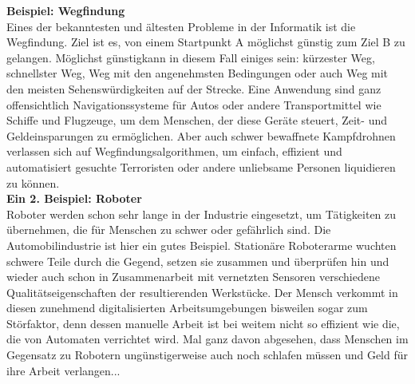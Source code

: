 {    \vspace{3mm}


    \textbf{Beispiel: Wegfindung}\\
    Eines der bekanntesten und ältesten Probleme in der Informatik ist die Wegfindung. Ziel ist es, von einem Startpunkt A möglichst günstig zum Ziel B zu gelangen. \glqq Möglichst günstig\grqq kann in diesem Fall einiges sein: kürzester Weg, schnellster Weg, Weg mit den angenehmsten Bedingungen oder auch Weg mit den meisten Sehenswürdigkeiten auf der Strecke. Eine Anwendung sind ganz offensichtlich Navigationssysteme für Autos oder andere Transportmittel wie Schiffe und Flugzeuge, um dem Menschen, der diese Geräte steuert, Zeit- und Geldeinsparungen zu ermöglichen. Aber auch schwer bewaffnete Kampfdrohnen verlassen sich auf Wegfindungsalgorithmen, um einfach, effizient und automatisiert gesuchte Terroristen oder andere unliebsame Personen liquidieren zu können.\\

    \textbf{Ein 2. Beispiel: Roboter}\\
    Roboter werden schon sehr lange in der Industrie eingesetzt, um Tätigkeiten zu übernehmen, die für Menschen zu schwer oder gefährlich sind. Die Automobilindustrie ist hier ein gutes Beispiel. Stationäre Roboterarme wuchten schwere Teile durch die Gegend, setzen sie zusammen und überprüfen hin und wieder auch schon in Zusammenarbeit mit vernetzten Sensoren verschiedene Qualitätseigenschaften der resultierenden Werkstücke. Der Mensch verkommt in diesen zunehmend digitalisierten Arbeitsumgebungen bisweilen sogar zum Störfaktor, denn dessen manuelle Arbeit ist bei weitem nicht so effizient wie die, die von Automaten verrichtet wird. Mal ganz davon abgesehen, dass Menschen im Gegensatz zu Robotern ungünstigerweise auch noch schlafen müssen und Geld für ihre Arbeit verlangen...\\

}
